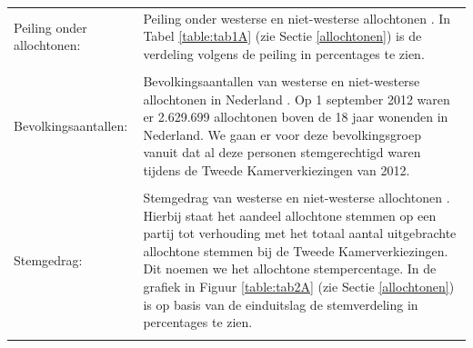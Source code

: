 \noindent\begin{tabularx}{\textwidth}{LI}
Peiling onder allochtonen: & Peiling onder westerse en niet-westerse allochtonen \citep{Opiniehuis}. In Tabel \ref{table:tab1A} (zie Sectie \ref{allochtonen}) is de verdeling volgens de peiling in percentages te zien.\\
\\
Bevolkingsaantallen: & Bevolkingsaantallen van westerse en niet-westerse allochtonen in Nederland \citep{CBS_allochtonen}. Op 1 september 2012 waren er 2.629.699 allochtonen boven de 18 jaar wonenden in Nederland. We gaan er voor deze bevolkingsgroep vanuit dat al deze personen stemgerechtigd waren tijdens de Tweede Kamerverkiezingen van 2012. \\
\\  
Stemgedrag:  & Stemgedrag van westerse en niet-westerse allochtonen \citep{CBS_stemgedrag}. Hierbij staat het aandeel allochtone stemmen op een partij tot verhouding met het totaal aantal uitgebrachte allochtone stemmen bij de Tweede Kamerverkiezingen. Dit noemen we het allochtone stempercentage. In de grafiek in Figuur \ref{table:tab2A} (zie Sectie \ref{allochtonen}) is op basis van de einduitslag de stemverdeling in percentages te zien.\\
 \\
\end{tabularx}

